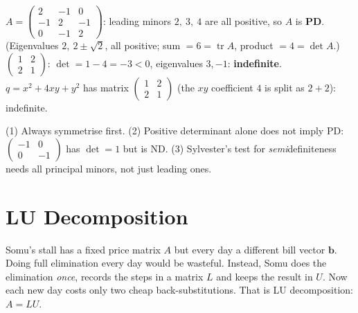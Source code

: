\documentclass[11pt,a4paper]{article}
\newcommand{\tr}{\operatorname{tr}}
\begin{document}
\begin{example}
$A=\begin{pmatrix}2&-1&0\\-1&2&-1\\0&-1&2\end{pmatrix}$: leading minors $2,\ 3,\ 4$ are all positive, so $A$ is \textbf{PD}. (Eigenvalues $2,\ 2\pm\sqrt2$, all positive; sum $=6=\tr A$, product $=4=\det A$.)\\
$\begin{pmatrix}1&2\\2&1\end{pmatrix}$: $\det=1-4=-3<0$, eigenvalues $3,-1$: \textbf{indefinite}.\\
$q=x^2+4xy+y^2$ has matrix $\begin{pmatrix}1&2\\2&1\end{pmatrix}$ (the $xy$ coefficient $4$ is split as $2+2$): indefinite.
\end{example}

\begin{trap}
(1) Always symmetrise first. (2) Positive determinant alone does not imply PD: $\begin{pmatrix}-1&0\\0&-1\end{pmatrix}$ has $\det=1$ but is ND. (3) Sylvester's test for \emph{semi}definiteness needs all principal minors, not just leading ones.
\end{trap}

\newpage
\section{LU Decomposition}

\begin{story}
Somu's stall has a fixed price matrix $A$ but every day a different bill vector $\mathbf b$. Doing full elimination every day would be wasteful. Instead, Somu does the elimination \emph{once}, records the steps in a matrix $L$ and keeps the result in $U$. Now each new day costs only two cheap back-substitutions. That is LU decomposition: $A=LU$.
\end{story}
\end{document}
